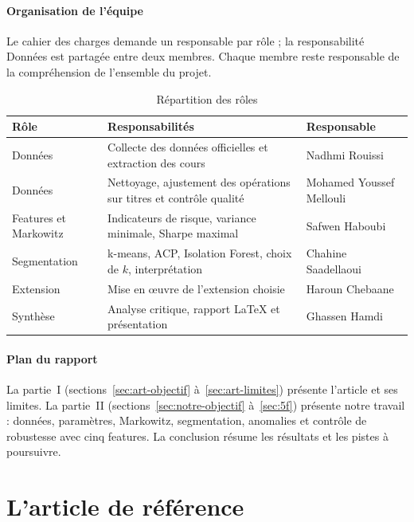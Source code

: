 \documentclass[11pt,a4paper]{article}
\begin{document}
\subsection{Organisation de l'équipe}
Le cahier des charges demande un responsable par r\^ole ; la responsabilit\'e Donn\'ees est partag\'ee entre deux membres. Chaque membre reste responsable de la compr\'ehension de l'ensemble du projet.

\begin{table}[H]\centering\small
\caption{Répartition des rôles}\label{tab:roles}
\begin{tabular}{lp{7.5cm}l}\toprule
Rôle & Responsabilités & Responsable \\ \midrule
Données & Collecte des données officielles et extraction des cours & Nadhmi Rouissi \\
Données & Nettoyage, ajustement des opérations sur titres et contrôle qualité & Mohamed Youssef Mellouli \\
Features et Markowitz & Indicateurs de risque, variance minimale, Sharpe maximal & Safwen Haboubi \\
Segmentation & k-means, ACP, Isolation Forest, choix de $k$, interprétation & Chahine Saadellaoui \\
Extension & Mise en œuvre de l'extension choisie & Haroun Chebaane \\
Synthèse & Analyse critique, rapport LaTeX et présentation & Ghassen Hamdi \\
\bottomrule\end{tabular}
\end{table}

\subsection{Plan du rapport}
La partie~I (sections~\ref{sec:art-objectif} à~\ref{sec:art-limites}) présente l'article et ses limites. La partie~II (sections~\ref{sec:notre-objectif} à~\ref{sec:5f}) présente notre travail : données, paramètres, Markowitz, segmentation, anomalies et contrôle de robustesse avec cinq features. La conclusion résume les résultats et les pistes à poursuivre.

\part{L'article de référence}
\end{document}
